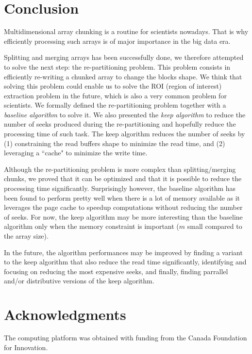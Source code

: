 \documentclass[sigconf, nonacm]{acmart}
\begin{document}
\section{Conclusion}

Multidimensional array chunking is a routine for scientists nowadays.
That is why efficiently processing such arrays is of major importance in the big data era.

Splitting and merging arrays has been successfully done, we therefore attempted
to solve the next step: the re-partitioning problem.
This problem consists in efficiently re-writing a chunked array to change the blocks shape.
We think that solving this problem could enable us to solve the ROI (region of interest)
extraction problem in the future, which is also a very common problem for scientists.
We formally defined the re-partitioning problem together with a \emph{baseline algorithm} to solve it.
We also presented the \emph{keep algorithm} to reduce the number of seeks produced during
the re-partitioning and hopefully reduce the processing time of such task.
The keep algorithm reduces the number of seeks by
(1) constraining the read buffers shape to minimize the read time, and
(2) leveraging a ``cache" to minimize the write time.

Although the re-partitioning problem is more complex than splitting/merging chunks,
we proved that it can be optimized and that it is possible to reduce the
processing time significantly.
Surprisingly however, the baseline algorithm has been found to perform pretty
well when there is a lot of memory available as it leverages the page cache to
speedup computations without reducing the number of seeks.
For now, the keep algorithm may be more interesting than the baseline algorithm
only when the memory constraint is important ($m$ small compared to the array size).

In the future, the algorithm performances may be improved by finding a variant
to the keep algorithm that also reduce the read time significantly,
identifying and focusing on reducing the most expensive seeks,
and finally, finding parrallel and/or distributive versions of the keep algorithm.

\section{Acknowledgments}

The computing platform was obtained with funding from the Canada Foundation for Innovation.



\end{document}
